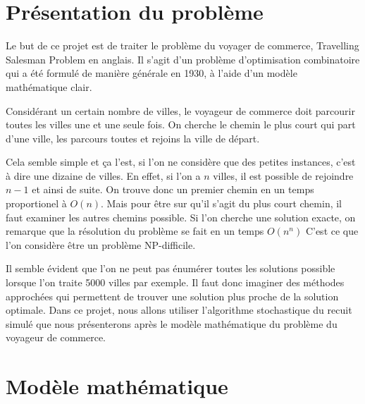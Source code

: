 \documentclass{article}
\begin{document}



\section{Présentation du problème}

Le but de ce projet est de traiter le problème du voyager de commerce, Travelling Salesman Problem en anglais.
Il s'agit d'un problème d'optimisation combinatoire qui a été formulé de manière générale en 1930, à l'aide d'un modèle mathématique clair.

Considérant un certain nombre de villes, le voyageur de commerce doit parcourir toutes les villes une et une seule fois.
On cherche le chemin le plus court qui part d'une ville, les parcours toutes et rejoins la ville de départ.

Cela semble simple et ça l'est, si l'on ne considère que des petites instances, c'est à dire une dizaine de villes.
En effet, si l'on a $n$ villes, il est possible de rejoindre $n-1$ et ainsi de suite.
On trouve donc un premier chemin en un temps proportionel à $O(n)$.
Mais pour être sur qu'il s'agit du plus court chemin, il faut examiner les autres chemins possible.
Si l'on cherche une solution exacte, on remarque que la résolution du problème se fait en un temps $O(n^{n})$
C'est ce que l'on considère être un problème NP-difficile.

Il semble évident que l'on ne peut pas énumérer toutes les solutions possible lorsque l'on traite 5000 villes par exemple.
Il faut donc imaginer des méthodes approchées qui permettent de trouver une solution plus proche de la solution optimale.
Dans ce projet, nous allons utiliser l'algorithme stochastique du recuit simulé que nous présenterons après le modèle mathématique du problème du voyageur de commerce.

\section{Modèle mathématique}
\end{document}
